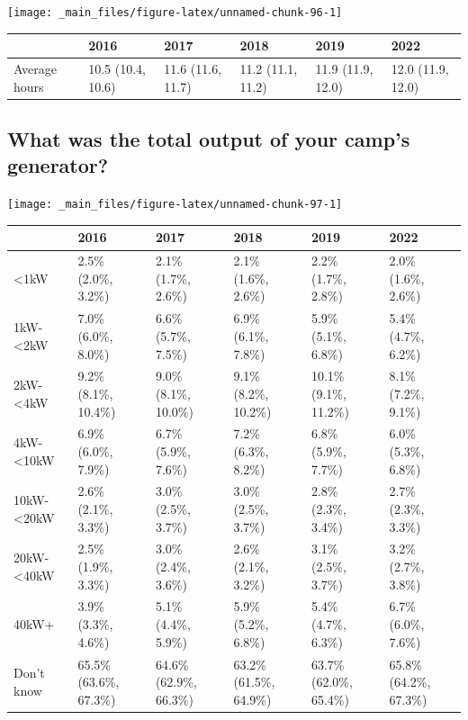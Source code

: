 \documentclass[
]{book}
\begin{document}
\texttt{[image: \_main\_files/figure-latex/unnamed-chunk-96-1]}

\begin{table}
\centering
\begin{tabular}[t]{>{}l|>{}l|>{}l|>{}l|>{}l|>{}l}
\hline
  & 2016 & 2017 & 2018 & 2019 & 2022\\
\hline
Average hours & 10.5 (10.4, 10.6) & 11.6 (11.6, 11.7) & 11.2 (11.1, 11.2) & 11.9 (11.9, 12.0) & 12.0 (11.9, 12.0)\\
\hline
\end{tabular}
\end{table}

\hypertarget{what-was-the-total-output-of-your-camps-generator}{%
\subsection{What was the total output of your camp's generator?}\label{what-was-the-total-output-of-your-camps-generator}}

\texttt{[image: \_main\_files/figure-latex/unnamed-chunk-97-1]}

\begin{table}
\centering
\begin{tabular}[t]{>{}l|>{}l|>{}l|>{}l|>{}l|>{}l}
\hline
  & 2016 & 2017 & 2018 & 2019 & 2022\\
\hline
<1kW & 2.5\% (2.0\%, 3.2\%) & 2.1\% (1.7\%, 2.6\%) & 2.1\% (1.6\%, 2.6\%) & 2.2\% (1.7\%, 2.8\%) & 2.0\% (1.6\%, 2.6\%)\\
\hline
1kW-<2kW & 7.0\% (6.0\%, 8.0\%) & 6.6\% (5.7\%, 7.5\%) & 6.9\% (6.1\%, 7.8\%) & 5.9\% (5.1\%, 6.8\%) & 5.4\% (4.7\%, 6.2\%)\\
\hline
2kW-<4kW & 9.2\% (8.1\%, 10.4\%) & 9.0\% (8.1\%, 10.0\%) & 9.1\% (8.2\%, 10.2\%) & 10.1\% (9.1\%, 11.2\%) & 8.1\% (7.2\%, 9.1\%)\\
\hline
4kW-<10kW & 6.9\% (6.0\%, 7.9\%) & 6.7\% (5.9\%, 7.6\%) & 7.2\% (6.3\%, 8.2\%) & 6.8\% (5.9\%, 7.7\%) & 6.0\% (5.3\%, 6.8\%)\\
\hline
10kW-<20kW & 2.6\% (2.1\%, 3.3\%) & 3.0\% (2.5\%, 3.7\%) & 3.0\% (2.5\%, 3.7\%) & 2.8\% (2.3\%, 3.4\%) & 2.7\% (2.3\%, 3.3\%)\\
\hline
20kW-<40kW & 2.5\% (1.9\%, 3.3\%) & 3.0\% (2.4\%, 3.6\%) & 2.6\% (2.1\%, 3.2\%) & 3.1\% (2.5\%, 3.7\%) & 3.2\% (2.7\%, 3.8\%)\\
\hline
40kW+ & 3.9\% (3.3\%, 4.6\%) & 5.1\% (4.4\%, 5.9\%) & 5.9\% (5.2\%, 6.8\%) & 5.4\% (4.7\%, 6.3\%) & 6.7\% (6.0\%, 7.6\%)\\
\hline
Don't know & 65.5\% (63.6\%, 67.3\%) & 64.6\% (62.9\%, 66.3\%) & 63.2\% (61.5\%, 64.9\%) & 63.7\% (62.0\%, 65.4\%) & 65.8\% (64.2\%, 67.3\%)\\
\hline
\end{tabular}
\end{table}

  
\end{document}
